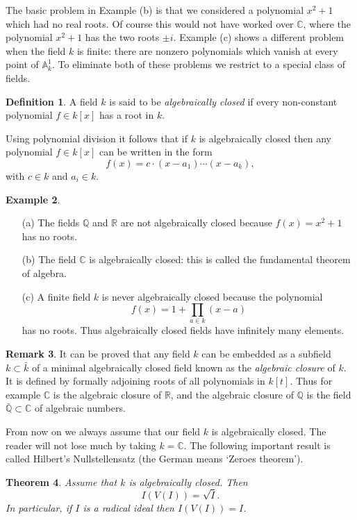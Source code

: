 \documentclass [12pt,oneside,a4paper,mathscr]{amsart}
\newtheorem{thm}{Theorem}[section]
\theoremstyle{definition}
\newtheorem{defn}[thm]{Definition}
\newtheorem{remark}[thm]{Remark}
\newtheorem{example}[thm]{Example}
\newcommand {\A}{\mathbb A}
\newcommand {\C}{\mathbb C}
\newcommand{\Q}{\mathbb{Q}}
\newcommand{\R}{\mathbb{R}}
\begin{document}
The basic problem in Example (b) is that we considered a polynomial $x^2+1$ which had no real roots. Of course this would not have worked over $\C$, where the polynomial $x^2+1$ has the two roots $\pm i$. Example  (c) shows a different problem when the field $k$ is finite: there are nonzero polynomials which vanish at every point of $\A^1_k$. To eliminate both of these problems we restrict to a special class of fields.

\begin{defn}
A field $k$ is said to be \emph{algebraically closed} if every non-constant polynomial $f\in k[x]$ has a root in $k$.
\end{defn}

Using polynomial division it follows that if $k$ is algebraically closed then any  polynomial $f\in k[x]$ can be written in the form
\[f(x)=c\cdot (x-a_1) \cdots (x-a_k),\]
with $c\in k$ and $a_i\in k$.

\begin{example}
\begin{itemize}
\item[(a)] The fields $\Q$ and $\R$ are not algebraically closed because  $f(x)=x^2+1$ has no roots.
\smallskip
\item[(b)] The field $\C$ is algebraically closed: this is called the fundamental theorem of algebra.
\smallskip
\item[(c)] A finite field $k$ is never algebraically closed because  the polynomial \[f(x)=1+ \prod_{a\in k}(x-a)\] has no roots. Thus algebraically closed fields have infinitely many elements.
\end{itemize}
\end{example}

\begin{remark}It can be proved that  any field $k$ can be embedded as a subfield $k\subset \bar{k}$  of a minimal algebraically closed field known as the \emph{algebraic closure} of $k$. It is defined by formally adjoining roots of all polynomials in $k[t]$. Thus for example $\C$ is the algebraic closure of $\R$, and the algebraic closure of $\Q$ is the field $\bar{\Q}\subset \C$ of algebraic numbers. 
\end{remark}

From now on we always assume that our field $k$ is algebraically closed. The reader will not lose much by taking $k=\C$.
The following important result is called Hilbert's Nullstellensatz (the German means `Zeroes theorem').

\begin{thm}Assume that $k$ is algebraically closed. Then
\[I(V(I))=\sqrt{I}.\]
In particular, if $I$ is a radical ideal then $I(V(I))=I$.
\end{thm}
\end{document}
